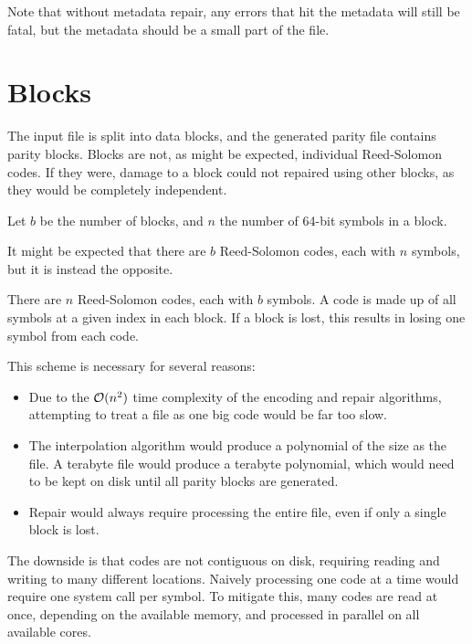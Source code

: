 Note that without metadata repair, any errors that hit the metadata will still be fatal, but the metadata should be a small part of the file.

\section{Blocks}

The input file is split into data blocks, and the generated parity file contains parity blocks.
Blocks are not, as might be expected, individual Reed-Solomon codes.
If they were, damage to a block could not repaired using other blocks, as they would be completely independent.

Let $b$ be the number of blocks, and $n$ the number of 64-bit symbols in a block.

It might be expected that there are $b$ Reed-Solomon codes, each with $n$ symbols, but it is instead the opposite.

There are $n$ Reed-Solomon codes, each with $b$ symbols.
A code is made up of all symbols at a given index in each block.
If a block is lost, this results in losing one symbol from each code.

This scheme is necessary for several reasons:
\begin{itemize}
    \item Due to the $\mathcal{O}(n^2)$ time complexity of the encoding and repair algorithms, attempting to treat a file as one big code would be far too slow.
    \item The interpolation algorithm would produce a polynomial of the size as the file. A terabyte file would produce a terabyte polynomial, which would need to be kept on disk until all parity blocks are generated.
    \item Repair would always require processing the entire file, even if only a single block is lost.
\end{itemize}

The downside is that codes are not contiguous on disk, requiring reading and writing to many different locations.
Naively processing one code at a time would require one system call per symbol.
To mitigate this, many codes are read at once, depending on the available memory, and processed in parallel on all available cores.
